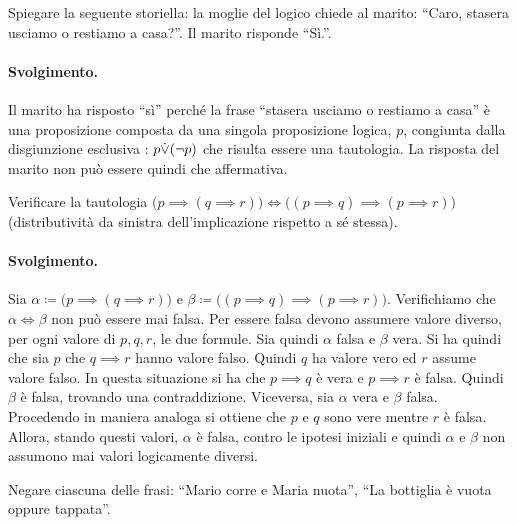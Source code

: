 \begin{exsbox}
	Spiegare la seguente storiella: la moglie del logico chiede al marito: ``Caro, stasera usciamo o restiamo a casa?''. Il marito risponde ``Sì.''.
\end{exsbox}
\paragraph*{Svolgimento.} Il marito ha risposto ``sì'' perché la frase ``stasera usciamo o restiamo a casa'' è una proposizione composta da una singola proposizione logica, $p$, congiunta dalla disgiunzione esclusiva : $p {\displaystyle{\dot{\vee}}} (\neg p)$ che risulta essere una tautologia. La risposta del marito non può essere quindi che affermativa. \hfill \blacksquare

\begin{exsbox}
	Verificare la tautologia $\bigl(p \implies (q \implies r)\bigr) \iff \bigl((p \implies q) \implies (p \implies r) \bigr)$ (distributività da sinistra dell'implicazione rispetto a sé stessa).
\end{exsbox}
\paragraph*{Svolgimento.} Sia $\alpha \coloneqq \bigl(p \implies (q \implies r)\bigr)$ e $\beta \coloneqq \bigl((p \implies q) \implies (p \implies r) \bigr)$. Verifichiamo che $\alpha \iff \beta$ non può essere mai falsa. Per essere falsa devono assumere valore diverso, per ogni valore di $p,q,r$, le due formule. Sia quindi $\alpha$ falsa e $\beta$ vera. Si ha quindi che sia $p$ che $q \implies r$ hanno valore falso. Quindi $q$ ha valore vero ed $r$ assume valore falso. In questa situazione si ha che $p \implies q$ è vera e $p \implies r$ è falsa. Quindi $\beta$ è falsa, trovando una contraddizione. Viceversa, sia $\alpha$ vera e $\beta$ falsa. Procedendo in maniera analoga si ottiene che $p$ e $q$ sono vere mentre $r$ è falsa. Allora, stando questi valori, $\alpha$ è falsa, contro le ipotesi iniziali e quindi $\alpha$ e $\beta$ non assumono mai valori logicamente diversi. \hfill \blacksquare

\begin{exsbox}
	Negare ciascuna delle frasi: ``Mario corre e Maria nuota'', ``La bottiglia è vuota oppure tappata''.
\end{exsbox}
